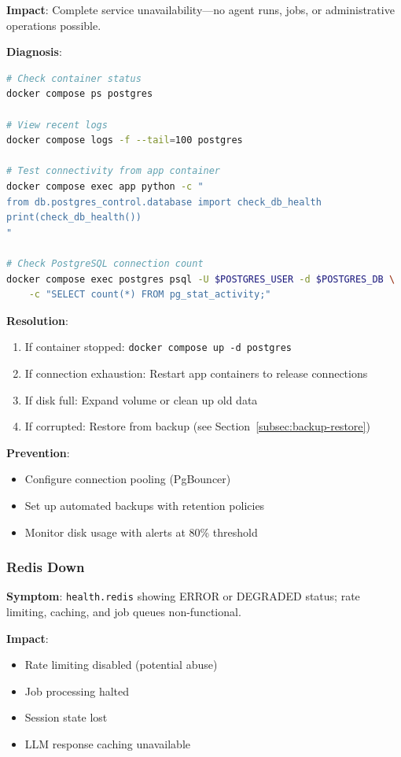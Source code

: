 \textbf{Impact}: Complete service unavailability---no agent runs, jobs, or administrative operations possible.

\textbf{Diagnosis}:
\begin{lstlisting}[language=bash, caption={PostgreSQL diagnostic commands}]
# Check container status
docker compose ps postgres

# View recent logs
docker compose logs -f --tail=100 postgres

# Test connectivity from app container
docker compose exec app python -c "
from db.postgres_control.database import check_db_health
print(check_db_health())
"

# Check PostgreSQL connection count
docker compose exec postgres psql -U $POSTGRES_USER -d $POSTGRES_DB \
    -c "SELECT count(*) FROM pg_stat_activity;"
\end{lstlisting}

\textbf{Resolution}:
\begin{enumerate}
    \item If container stopped: \texttt{docker compose up -d postgres}
    \item If connection exhaustion: Restart app containers to release connections
    \item If disk full: Expand volume or clean up old data
    \item If corrupted: Restore from backup (see Section~\ref{subsec:backup-restore})
\end{enumerate}

\textbf{Prevention}:
\begin{itemize}
    \item Configure connection pooling (PgBouncer)
    \item Set up automated backups with retention policies
    \item Monitor disk usage with alerts at 80\% threshold
\end{itemize}

\subsubsection{Redis Down}

\textbf{Symptom}: \texttt{health.redis} showing ERROR or DEGRADED status; rate limiting, caching, and job queues non-functional.

\textbf{Impact}: 
\begin{itemize}
    \item Rate limiting disabled (potential abuse)
    \item Job processing halted
    \item Session state lost
    \item LLM response caching unavailable
\end{itemize}

